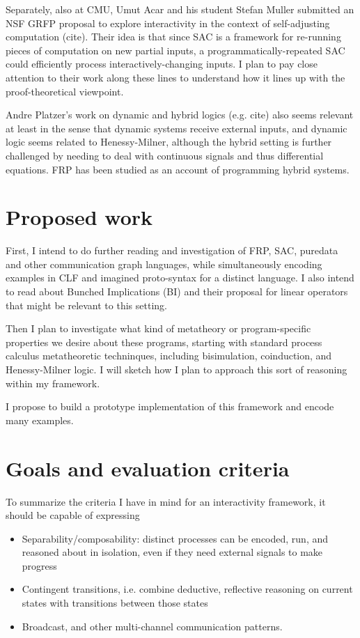 \documentclass{article}
\begin{document}
Separately, also at CMU, Umut Acar and his student Stefan Muller submitted
an NSF GRFP proposal to explore interactivity in the context of
self-adjusting computation (cite). Their idea is that since SAC is a
framework for re-running pieces of computation on new partial inputs, a
programmatically-repeated SAC could efficiently process
interactively-changing inputs. I plan to pay close attention to their work
along these lines to understand how it lines up with the proof-theoretical
viewpoint.

Andre Platzer's work on dynamic and hybrid logics (e.g. cite) also seems
relevant at least in the sense that dynamic systems receive external
inputs, and dynamic logic seems related to Henessy-Milner, although the
hybrid setting is further challenged by needing to deal with continuous
signals and thus differential equations. FRP has been studied as an account
of programming hybrid systems.~\cite{Hudak2003}

\section{Proposed work}

First, I intend to do further reading and investigation of FRP, SAC,
puredata and other communication graph languages, while simultaneously
encoding examples in CLF and imagined proto-syntax for a distinct language.
I also intend to read about Bunched Implications (BI) and their proposal
for linear operators that might be relevant to this setting.

Then I plan to investigate what kind of metatheory or program-specific
properties we desire about these programs, starting with standard process
calculus metatheoretic techninques, including bisimulation, coinduction,
and Henessy-Milner logic. I will sketch how I plan to approach this sort of
reasoning within my framework.

I propose to build a prototype implementation of this framework and encode
many examples.

\section{Goals and evaluation criteria}

To summarize the criteria I have in mind for an interactivity framework, it
should be capable of expressing
\begin{itemize}
\item Separability/composability: distinct processes can be encoded, run,
and reasoned about in isolation, even if they need external signals to make
progress
\item Contingent transitions, i.e. combine deductive, reflective reasoning
on current states with transitions between those states
\item Broadcast, and other multi-channel communication patterns.
\end{itemize}




\end{document}
